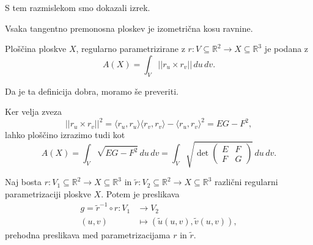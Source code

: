 S tem razmislekom smo dokazali izrek.

\begin{izrek}
\label{izr_tangentno_premonosna_ploskev_izometricna_kosu_ravnine}
  Vsaka tangentno premonosna ploskev je izometrična kosu ravnine.
\end{izrek}

\begin{definicija}
\label{def_ploscina_plosvke}
  Ploščina ploskve $X$, regularno parametrizirane z $r: V \subseteq  \mathbb{R}^2 \to  X \subseteq  \mathbb{R}^3$ je podana z 
  \begin{equation*} A(X) = \int_{V} \lvert\lvert r_u \times  r_v \rvert\rvert   \, du \, dv.\end{equation*} 
\end{definicija}

\begin{opomba}
 Da je ta definicija dobra, moramo še preveriti.
\end{opomba}

\begin{opomba}
 Ker velja zveza
 \begin{equation*} \lvert\lvert r_u \times  r_v \rvert\rvert^2  = \langle r_u, r_u \rangle \langle r_v , r_v \rangle  - \langle r_u, r_v \rangle^2 = EG - F^2, \end{equation*}
lahko ploščino izrazimo tudi kot 
 \begin{equation*} A(X) = \int_{V} \sqrt{EG - F^2}  \, du \, dv = \int_{V} \sqrt{\det \begin{pmatrix}
 E & F \\
 F & G
 \end{pmatrix}}  \, du \, dv. \end{equation*}
\end{opomba}

\begin{definicija}
\label{def_prehodna_preslikava_med_parametrizacijama}
 Naj bosta $r: V_1 \subseteq  \mathbb{R}^2 \to  X \subseteq  \mathbb{R}^3$ in $\tilde{r}: V_2 \subseteq  \mathbb{R}^2 \to  X \subseteq  \mathbb{R}^3$ različni regularni parametrizaciji ploskve $X$.
 Potem je preslikava \begin{align*}
  g = \tilde{r}^{-1} \circ r: V_1 &\longrightarrow V_2 \\
  (u,v) &\longmapsto (\tilde{u}(u,v), \tilde{v}(u,v)),
 \end{align*}
 prehodna preslikava med parametrizacijama $r$ in $\tilde{r}$.
\end{definicija}


